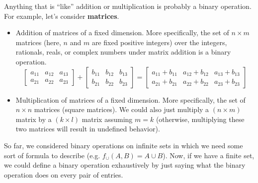 \documentclass[letterpaper]{article}
\begin{document}
Anything that is ``like'' addition or multiplication is probably a binary operation. For example, let's consider \textbf{matrices}.
\begin{itemize}
    \item Addition of matrices of a fixed dimension. More specifically, the set of $n \times m$ matrices (here, $n$ and $m$ are fixed positive integers) over the integers, rationals, reals, or complex numbers under matrix addition is a binary operation.
    \[
        \begin{bmatrix}
            a_{11} & a_{12} & a_{13} \\ 
            a_{21} & a_{22} & a_{23}
        \end{bmatrix} + \begin{bmatrix}
            b_{11} & b_{12} & b_{13} \\ 
            b_{21} & b_{22} & b_{23}
        \end{bmatrix} = \begin{bmatrix}
            a_{11} + b_{11} & a_{12} + b_{12} & a_{13} + b_{13} \\ 
            a_{21} + b_{21} & a_{22} + b_{22} & a_{23} + b_{23}
        \end{bmatrix}
    \]

    \item Multiplication of matrices of a fixed dimension. More specifically, the set of $n \times n$ matrices (square matrices). We could also just multiply a $(n \times m)$ matrix by a $(k \times l)$ matrix assuming $m = k$ (otherwise, multiplying these two matrices will result in undefined behavior). 
\end{itemize}

So far, we considered binary operations on infinite sets in which we need some sort of formula to describe (e.g. $f_{\cup}(A, B) = A \cup B$). Now, if we have a finite set, we could define a binary operation exhaustively by just saying what the binary operation does on every pair of entries.

\bigskip 
\end{document}
